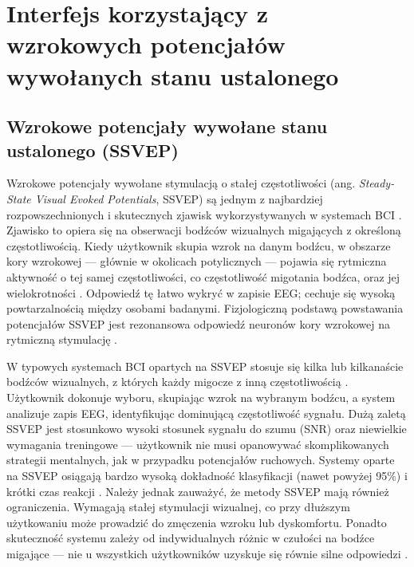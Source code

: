 
\chapter{Interfejs korzystający z wzrokowych potencjałów wywołanych stanu ustalonego}

\section{Wzrokowe potencjały wywołane stanu ustalonego (SSVEP)}

Wzrokowe potencjały wywołane stymulacją o stałej częstotliwości (ang. \textit{Steady-State Visual Evoked Potentials}, SSVEP) są jednym z najbardziej rozpowszechnionych i skutecznych zjawisk wykorzystywanych w systemach BCI \cite{nicolas2011, pfurtscheller1999, guger2000}. Zjawisko to opiera się na obserwacji bodźców wizualnych migających z określoną częstotliwością. Kiedy użytkownik skupia wzrok na danym bodźcu, w obszarze kory wzrokowej — głównie w okolicach potylicznych — pojawia się rytmiczna aktywność o tej samej częstotliwości, co częstotliwość migotania bodźca, oraz jej wielokrotności \cite{wolpaw2002, friman2007, vialatte2010}. Odpowiedź tę łatwo wykryć w zapisie EEG; cechuje się wysoką powtarzalnością między osobami badanymi. Fizjologiczną podstawą powstawania potencjałów SSVEP jest rezonansowa odpowiedź neuronów kory wzrokowej na rytmiczną stymulację \cite{norcia2015, regan1989, herrmann2001, pfurtscheller1999}.

W typowych systemach BCI opartych na SSVEP stosuje się kilka lub kilkanaście bodźców wizualnych, z których każdy migocze z inną częstotliwością \cite{muller2008, bin2009}. Użytkownik dokonuje wyboru, skupiając wzrok na wybranym bodźcu, a system analizuje zapis EEG, identyfikując dominującą częstotliwość sygnału. Dużą zaletą SSVEP jest stosunkowo wysoki stosunek sygnału do szumu (SNR) oraz niewielkie wymagania treningowe — użytkownik nie musi opanowywać skomplikowanych strategii mentalnych, jak w przypadku potencjałów ruchowych. Systemy oparte na SSVEP osiągają bardzo wysoką dokładność klasyfikacji (nawet powyżej 95\%) i krótki czas reakcji \cite{nakanishi2018}. Należy jednak zauważyć, że metody SSVEP mają również ograniczenia. Wymagają stałej stymulacji wizualnej, co przy dłuższym użytkowaniu może prowadzić do zmęczenia wzroku lub dyskomfortu. Ponadto skuteczność systemu zależy od indywidualnych różnic w czułości na bodźce migające — nie u wszystkich użytkowników uzyskuje się równie silne odpowiedzi \cite{vialatte2010, friman2007}.

